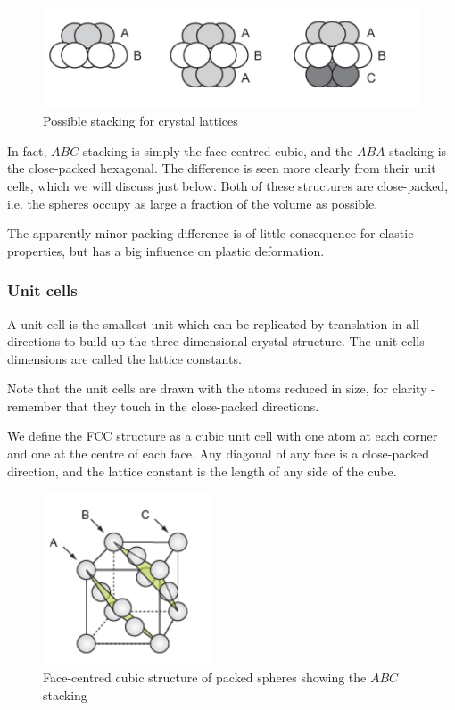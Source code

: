 \documentclass{article}
\begin{document}
\begin{figure}[h]
    \centering
    \includegraphics{images/mat3.png}
    \caption{Possible stacking for crystal lattices}
    \label{fig:enter-label}
\end{figure}

In fact, $ABC$ stacking is simply the face-centred cubic, and the $ABA$ stacking is the close-packed hexagonal. The difference is seen more clearly from their unit cells, which we will discuss just below. Both of these structures are close-packed, i.e. the spheres occupy as large a fraction of the volume as possible.

The apparently minor packing difference is of little consequence for elastic properties, but has a big influence on plastic deformation.

\subsubsection{Unit cells}

\begin{definition}
    A unit cell is the smallest unit which can be replicated by translation in all directions to build up the three-dimensional crystal structure. The unit cells dimensions are called the lattice constants.
\end{definition}

Note that the unit cells are drawn with the atoms reduced in size, for clarity - remember that they touch in the close-packed directions.

\begin{definition}
    We define the FCC structure as a cubic unit cell with one atom at each corner and one at the centre of each face. Any diagonal of any face is a close-packed direction, and the lattice constant is the length of any side of the cube.
\end{definition}

\begin{figure}[h]
    \centering
    \includegraphics[width = 0.45\textwidth]{images/mat4.png}
    \caption{Face-centred cubic structure of packed spheres showing the $ABC$ stacking}
    \label{fig:enter-label}
\end{figure}
\end{document}
